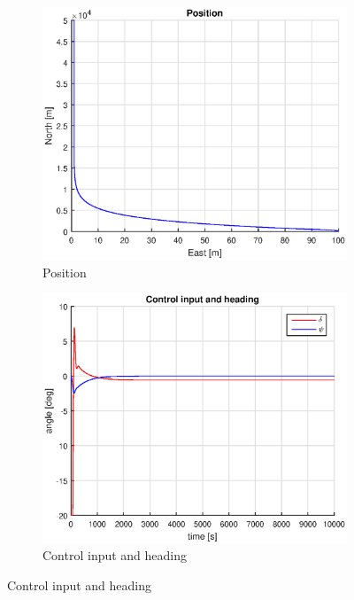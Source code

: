 \begin{figure}[h]
    \centering
    \begin{subfigure}[b]{0.45\textwidth}
        \includegraphics[width=\textwidth]{plots/2_4_pos_PD.eps}
        \caption{Position}
        \label{fig:24_pos_pd}
    \end{subfigure}
    \begin{subfigure}[b]{0.45\textwidth}
        \includegraphics[width=\textwidth]{plots/2_4_ctrl_PD.eps}
        \caption{Control input and heading}
        \label{fig:24_ctrl_pd}
    \end{subfigure}

\end{figure}
